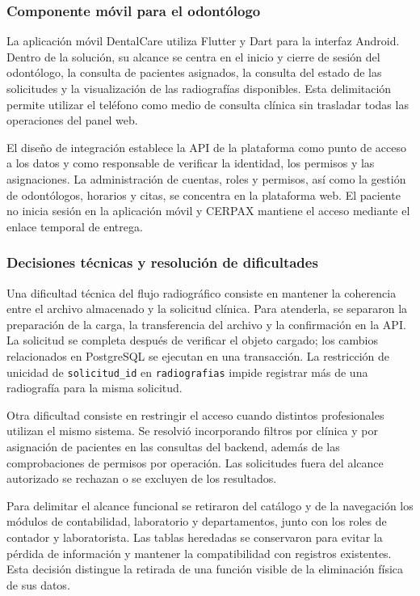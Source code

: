 \subsubsection{Componente móvil para el odontólogo}

La aplicación móvil DentalCare utiliza Flutter y Dart para la interfaz
Android. Dentro de la solución, su alcance se centra en el inicio y cierre
de sesión del odontólogo, la consulta de pacientes asignados, la consulta
del estado de las solicitudes y la visualización de las radiografías
disponibles. Esta delimitación permite utilizar el teléfono como medio de
consulta clínica sin trasladar todas las operaciones del panel web.

El diseño de integración establece la API de la plataforma como punto de
acceso a los datos y como responsable de verificar la identidad, los
permisos y las asignaciones. La administración de cuentas, roles y
permisos, así como la gestión de odontólogos, horarios y citas, se concentra
en la plataforma web. El paciente no inicia sesión en la aplicación móvil
y CERPAX mantiene el acceso mediante el enlace temporal de entrega.

\subsubsection{Decisiones técnicas y resolución de dificultades}

Una dificultad técnica del flujo radiográfico consiste en mantener la
coherencia entre el archivo almacenado y la solicitud clínica. Para
atenderla, se separaron la preparación de la carga, la transferencia del
archivo y la confirmación en la API. La solicitud se completa después de
verificar el objeto cargado; los cambios relacionados en PostgreSQL se
ejecutan en una transacción. La restricción de unicidad de
\texttt{solicitud\_id} en \texttt{radiografias} impide registrar más de
una radiografía para la misma solicitud.

Otra dificultad consiste en restringir el acceso cuando distintos
profesionales utilizan el mismo sistema. Se resolvió incorporando filtros
por clínica y por asignación de pacientes en las consultas del backend,
además de las comprobaciones de permisos por operación. Las solicitudes
fuera del alcance autorizado se rechazan o se excluyen de los resultados.

Para delimitar el alcance funcional se retiraron del catálogo y de la
navegación los módulos de contabilidad, laboratorio y departamentos, junto
con los roles de contador y laboratorista. Las tablas heredadas se
conservaron para evitar la pérdida de información y mantener la
compatibilidad con registros existentes. Esta decisión distingue la
retirada de una función visible de la eliminación física de sus datos.

